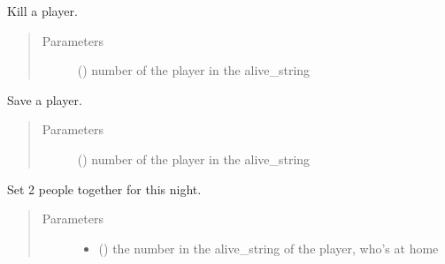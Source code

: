 \documentclass[letterpaper,10pt,english]{sphinxmanual}
\begin{document}
\begin{fulllineitems}
\begin{fulllineitems}
\label{\detokenize{chatwolf:chatwolf.nightactions.Nightactions.kill}}
Kill a player.
\begin{quote}\begin{description}
\item[{Parameters}] \leavevmode
{} (\sphinxstyleliteralemphasis{\sphinxupquote{{[}}}\sphinxstyleliteralemphasis{\sphinxupquote{{]}}}) \textendash{} number of the player in the alive\_string

\end{description}\end{quote}

\end{fulllineitems}


\begin{fulllineitems}
\label{\detokenize{chatwolf:chatwolf.nightactions.Nightactions.save}}
Save a player.
\begin{quote}\begin{description}
\item[{Parameters}] \leavevmode
{} (\sphinxstyleliteralemphasis{\sphinxupquote{{[}}}\sphinxstyleliteralemphasis{\sphinxupquote{{]}}}) \textendash{} number of the player in the alive\_string

\end{description}\end{quote}

\end{fulllineitems}


\begin{fulllineitems}
\label{\detokenize{chatwolf:chatwolf.nightactions.Nightactions.together}}
Set 2 people together for this night.
\begin{quote}\begin{description}
\item[{Parameters}] \leavevmode\begin{itemize}
\item {} 
 () \textendash{} the number in the alive\_string of the player, who’s at home


\end{itemize}
\end{description}
\end{quote}
\end{fulllineitems}
\end{fulllineitems}
\end{document}
